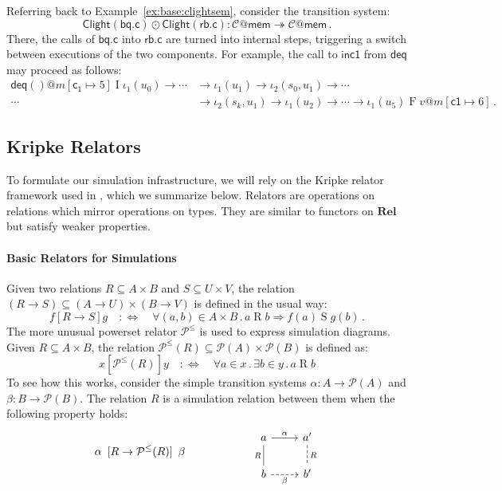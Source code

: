 \documentclass[acmsmall,screen,review,anonymous]{acmart}
\newcommand{\kw}[1]{\ensuremath{ \mathsf{#1} }}
\newcommand{\ifr}[1]{\mathrel{[{#1}]}}
\begin{document}
\begin{example} \label{ex:base:lcomp} %
Referring back to Example~\ref{ex:base:clightsem},
consider the transition system:
\[
  \kw{Clight}(\kw{bq.c}) \odot \kw{Clight}(\kw{rb.c}) :
  \mathcal{C}@\kw{mem} \twoheadrightarrow \mathcal{C}@\kw{mem}
  \,.
\]
There,
the calls of $\kw{bq.c}$ into $\kw{rb.c}$
are turned into internal steps,
triggering a switch between executions of the two components.
For example,
the call to $\kw{inc1}$ from $\kw{deq}$
may proceed as follows:
\begin{align*}
  \kw{deq}()@m[\kw{c_1} \mapsto 5] \mathrel{I} \iota_1(u_0)
  \rightarrow \cdots &\rightarrow \iota_1(u_1)
  \rightarrow \iota_2(s_0, u_1)
  \rightarrow \cdots \\ \cdots &\rightarrow \iota_2(s_k, u_1)
  \rightarrow \iota_1(u_2) \rightarrow \cdots
  \rightarrow \iota_1(u_5) \mathrel{F} v@m[\kw{c1} \mapsto 6]
  \,.
\end{align*}
\end{example}


\subsection{Kripke Relators} %

To formulate our simulation infrastructure,
we will rely on the Kripke relator framework
used in \citet{compcerto},
which we summarize below.
Relators are operations on relations
which mirror operations on types.
They are similar to functors on $\mathbf{Rel}$
but satisfy weaker properties.

\paragraph{Basic Relators for Simulations}

Given two relations
$R \subseteq A \times B$ and
$S \subseteq U \times V$,
the relation
$(R \rightarrow S) \subseteq
 (A \rightarrow U) \times
 (B \rightarrow V)$
is defined in the usual way:
\[
  f \ifr{R \rightarrow S} g
  \quad:\Leftrightarrow\quad
  \forall (a, b) \in A \times B \mathbin.
    a \mathrel{R} b \Rightarrow
    f(a) \mathrel{S} g(b)
  \,.
\]
The more unusual powerset relator $\mathcal{P}^\le$
is used to express simulation diagrams.
Given $R \subseteq A \times B$,
the relation
$\mathcal{P}^\le(R) \subseteq \mathcal{P}(A) \times \mathcal{P}(B)$
is defined as:
\[
  x \ifr{\mathcal{P}^\le(R)} y
  \quad:\Leftrightarrow\quad
  \forall a \in x \mathbin.
  \exists b \in y \mathbin.
  a \mathrel{R} b
\]
To see how this works,
consider the simple transition systems
$\alpha : A \rightarrow \mathcal{P}(A)$
and
$\beta : B \rightarrow \mathcal{P}(B)$.
The relation $R$ is a simulation relation between them
when the following property holds:
\[
  \alpha \:\ifr{R \rightarrow \mathcal{P}^\le(R)}\: \beta
  \qquad\qquad\qquad
  \begin{tikzcd}
    a \ar[r, "\alpha"] \ar[d, dash, "R"'] &
    a' \ar[d, dash, dashed, "R"] \\
    b \ar[r, dashed, "\beta"'] &
    b'
  \end{tikzcd}
\]
\end{document}
